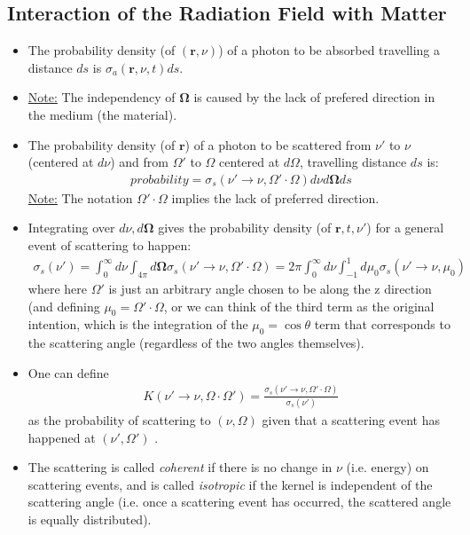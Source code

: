\documentclass[15pt]{article}
\begin{document}
\subsection{Interaction of the Radiation Field with Matter}
\begin{itemize}
    \item The probability density (of $(\bm r,\nu)$) of a photon to be absorbed travelling a distance $ds$ is $\sigma_a(\bm r,\nu,t)ds$. 
\item \underline{Note:} The independency of $\bm\Omega$ is caused by the lack of prefered direction in the medium (the material).
\item The probability density (of $\bm r$) of a photon to be scattered from $\nu'$ to $\nu$ (centered at $d\nu$) and from $\Omega'$ to $\Omega$ centered at $d\Omega$, travelling distance $ds$ is:
\begin{align}
    probability = \sigma_s(\nu'\to\nu,\Omega'\cdot\Omega)d\nu d\bm\Omega ds
\end{align}
\underline{Note:} The notation $\Omega'\cdot\Omega$ implies the lack of preferred direction.
\item Integrating over $d\nu,d\bm\Omega$ gives the probability density (of $\bm r,t,\nu'$) for a general event of scattering to happen:
\begin{align}
    \sigma_s(\nu')=\int_0^\infty d\nu \int_{4\pi} d\bm\Omega \sigma_s(\nu'\to \nu,\Omega'\cdot\Omega)=2\pi\int_0^\infty d\nu \int_{-1}^{1}d\mu_{0}\sigma_s(\nu'\to\nu,\mu_0)
\end{align} 
where here $\Omega'$ is just an arbitrary angle chosen to be along the z direction (and defining $\mu_0=\Omega'\cdot\Omega$, or we can think of the third term as the original intention, which is the integration of the $\mu_0=\cos\theta$ term that corresponds to the scattering angle (regardless of the two angles themselves).
\item One can define
\begin{align}
    K(\nu'\to\nu,\Omega\cdot\Omega')=\frac{\sigma_s(\nu'\to\nu,\Omega'\cdot\Omega)}{\sigma_s(\nu')}
\end{align}
as the probability of scattering to $(\nu,\Omega)$ given that a scattering event has happened at $(\nu',\Omega')$ .
\item The scattering is called \textit{coherent} if there is no change in $\nu$ (i.e. energy) on scattering events, and is called \textit{isotropic} if the kernel is independent of the scattering angle (i.e. once a scattering event has occurred, the scattered angle is equally distributed).

\end{itemize}
\end{document}
